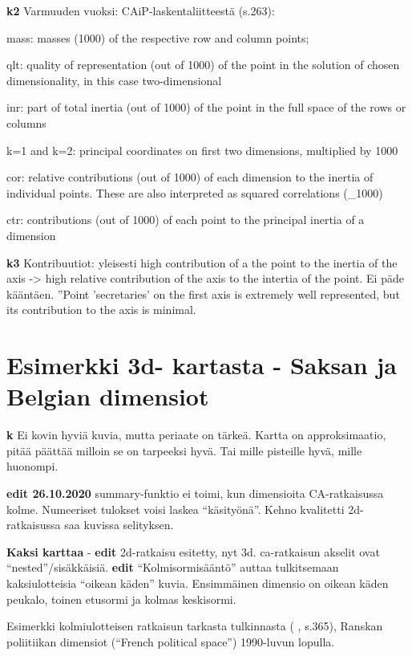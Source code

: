 \documentclass[
  finnish,
]{book}
\begin{document}
\textbf{k2} Varmuuden vuoksi: CAiP-laskentaliitteestä (s.263):

mass: masses (1000) of the respective row and column points;

qlt: quality of representation (out of 1000) of the point in the solution of
chosen dimensionality, in this case two-dimensional

inr: part of total inertia (out of 1000) of the point in the full space of the
rows or columns

k=1 and k=2: principal coordinates on first two dimensions, multiplied by 1000

cor: relative contributions (out of 1000) of each dimension to the inertia of
individual points. These are also interpreted as squared correlations (\_1000)

ctr: contributions (out of 1000) of each point to the principal inertia of a dimension

\textbf{k3} Kontribuutiot: yleisesti high contribution of a the point to the inertia of the
axis -\textgreater{} high relative contribution of the axis to the intertia of the point.
Ei päde kääntäen. ''Point 'secretaries' on the first axis is extremely
well represented, but its contribution to the axis is minimal.

\hypertarget{esimerkki-3d--kartasta---saksan-ja-belgian-dimensiot}{%
\section{Esimerkki 3d- kartasta - Saksan ja Belgian dimensiot}\label{esimerkki-3d--kartasta---saksan-ja-belgian-dimensiot}}

\textbf{k} Ei kovin hyviä kuvia, mutta periaate on tärkeä. Kartta on approksimaatio,
pitää päättää milloin se on tarpeeksi hyvä. Tai mille pisteille hyvä, mille huonompi.

\textbf{edit 26.10.2020} summary-funktio ei toimi, kun dimensioita CA-ratkaisussa kolme.
Numeeriset tulokset voisi laskea ``käsityönä''. Kehno kvalitetti 2d-ratkaisussa saa
kuvissa selityksen.

\textbf{Kaksi karttaa} - \textbf{edit} 2d-ratkaisu esitetty, nyt 3d. ca-ratkaisun akselit ovat ``nested''/sisäkkäisiä.
\textbf{edit} ``Kolmisormisääntö'' auttaa tulkitsemaan kaksiulotteisia ``oikean käden''
kuvia. Ensimmäinen dimensio on oikean käden peukalo, toinen etusormi ja kolmas
keskisormi.

Esimerkki kolmiulotteisen ratkaisun tarkasta tulkinnasta ( \citet{RefWorks:doc:5a857a43e4b0ed2d44664d75} , s.365),
Ranskan poliitiikan dimensiot (``French political space'') 1990-luvun lopulla.
\end{document}
